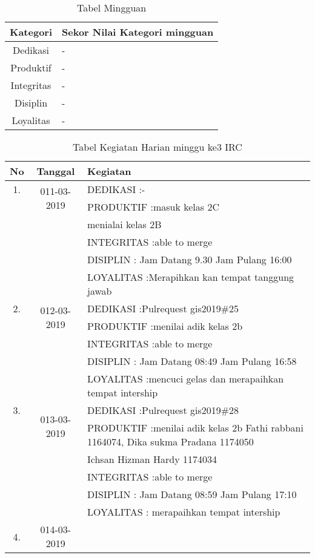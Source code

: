 \begin{table}[h]
\begin{center}
\caption{Tabel Mingguan}
\begin{tabular}{|c|l|}
\hline
Kategori& Sekor Nilai Kategori mingguan\\
\hline
Dedikasi & -\\
\hline
Produktif & -\\
\hline
Integritas & -\\
\hline
Disiplin & -\\
\hline
Loyalitas & -\\
\hline
\end{tabular}
\end{center}
\label {Tabel:contoh} 
\end{table}

\begin{table}[h]
\caption{Tabel Kegiatan Harian minggu ke3 IRC}
\centering
\begin{tabular}{|c|c|l|}
\hline
No&Tanggal&Kegiatan\\
\hline
1.&\multirow{2}{*}{011-03-2019}
&DEDIKASI :- \\
&&PRODUKTIF :masuk kelas 2C\\
		     &&menialai kelas 2B\\
&&INTEGRITAS :able to merge\\
&&DISIPLIN : Jam Datang 9.30 Jam Pulang 16:00\\
&&LOYALITAS :Merapihkan kan tempat tanggung jawab\\
\hline
2.&\multirow{2}{*}{012-03-2019}
&DEDIKASI :Pulrequest gis2019\#25 \\
&&PRODUKTIF :menilai adik kelas 2b\\
&&INTEGRITAS :able to merge\\
&&DISIPLIN : Jam Datang 08:49 Jam Pulang 16:58\\
&&LOYALITAS :mencuci gelas dan merapaihkan tempat intership\\
\hline
3.&\multirow{2}{*}{013-03-2019}
&DEDIKASI :Pulrequest gis2019\#28 \\
&&PRODUKTIF :menilai adik kelas 2b Fathi rabbani 1164074, Dika sukma Pradana 1174050\\
&&Ichsan Hizman Hardy 1174034\\
&&INTEGRITAS :able to merge\\
&&DISIPLIN : Jam Datang 08:59 Jam Pulang 17:10\\
&&LOYALITAS : merapaihkan tempat intership\\
\hline
4.&\multirow{2}{*}{014-03-2019}

\end{tabular}
\end{table}
